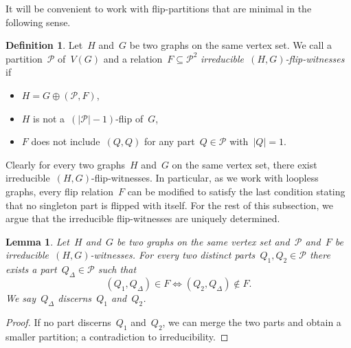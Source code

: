 \documentclass[11pt]{article}      \usepackage[margin=1in]{geometry}  \usepackage{microtype}
\newtheorem{lemma}[theorem]{Lemma}
\theoremstyle{definition}
\newtheorem{definition}[theorem]{Definition}
\newcommand{\PP}{\mathcal{P}}
\begin{document}
It will be convenient to work with flip-partitions that are minimal in the following sense.

\begin{definition}
    Let~$H$ and~$G$ be two graphs on the same vertex set.
    We call a partition~$\PP$ of~$V(G)$ and a relation~$F \subseteq \PP^2$  \emph{irreducible~$(H,G)$-flip-witnesses} if
    \begin{itemize}
        \item $H = G \oplus (\PP,F)$,
        \item $H$ is not a~$(|\PP|-1)$-flip of~$G$,
        \item $F$ does not include~$(Q,Q)$ for any part~$Q \in \PP$ with~$|Q| = 1$.
    \end{itemize}
\end{definition}

Clearly for every two graphs~$H$ and~$G$ on the same vertex set, there exist irreducible~$(H,G)$-flip-witnesses.
In particular, as we work with loopless graphs, every flip relation~$F$ can be modified to satisfy the last condition stating that no singleton part is flipped with itself.
For the rest of this subsection, we argue that the irreducible flip-witnesses are uniquely determined.

\begin{lemma}\label{lem:discerning-part}
    Let~$H$ and~$G$ be two graphs on the same vertex set and~$\PP$ and~$F$ be  irreducible~$(H,G)$-witnesses.
    For every two distinct parts~$Q_1,Q_2 \in \PP$ there exists a part~$Q_\Delta \in \PP$ such that
    \[
        (Q_1,Q_\Delta) \in F \Leftrightarrow  (Q_2,Q_\Delta) \notin F.
    \]
    We say~$Q_\Delta$ \emph{discerns}~$Q_1$ and~$Q_2$.
\end{lemma}
\begin{proof}
    If no part discerns~$Q_1$ and~$Q_2$, we can merge the two parts and obtain a smaller partition; a contradiction to irreducibility.
\end{proof}
\end{document}
